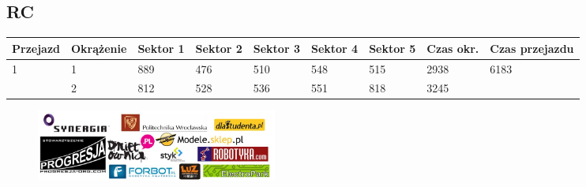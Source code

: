 \documentclass[11pt]{article}
\begin{document}
\subsection{RC}
\begin{table}[h]
\begin{tabular}{|l|l|l|l|l|l|l|l|l|}
\hline
 Przejazd        & Okrążenie & Sektor 1 & Sektor 2 & Sektor 3 & Sektor 4 & Sektor 5 & Czas okr. & Czas przejazdu    \\ \hline
\multirow{2}{*}{1}& 1 &889& 476& 510& 548& 515& 2938& \multirow{2}{*}{6183} \\ \cline{2-8}
& 2& 812& 528& 536& 551& 818& 3245& \\ \hline
\end{tabular}
\end{table}
\clearpage
\newpage
\begin{figure}
\centering
\includegraphics[width=300px, keepaspectratio=true]
{images/sponsors.jpg}
\end{figure}
\end{document}
